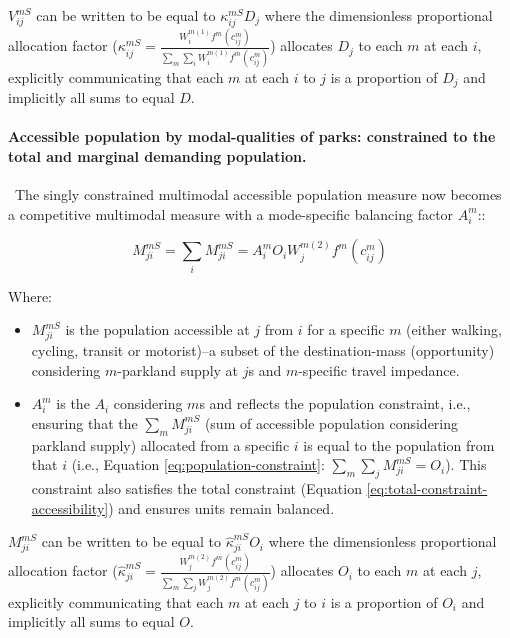 \documentclass[
11pt, %
oneside, %
english, %
singlespacing, %
]{macthesis} %
\def\tightlist{}
\begin{document}
\(V_{ij}^{mS}\) can be written to be equal to \(\kappa_{ij}^{mS} D_j\) where the dimensionless proportional allocation factor (\(\kappa_{ij}^{mS} = \frac{W_i^{m(1)} f^m(c^m_{ij})}{\sum_m\sum_i W_i^{m(1)} f^m(c^m_{ij})}\)) allocates \(D_j\) to each \(m\) at each \(i\), explicitly communicating that each \(m\) at each \(i\) to \(j\) is a proportion of \(D_j\) and implicitly all sums to equal \(D\).

\paragraph{Accessible population by modal-qualities of parks: constrained to the total and marginal demanding population.}\label{accessible-population-by-modal-qualities-of-parks-constrained-to-the-total-and-marginal-demanding-population.}

~The singly constrained multimodal accessible population measure now becomes a competitive multimodal measure with a mode-specific balancing factor \(A_i^{m}\)::

\begin{equation}
\label{eq:singly-constrained-multimodal-market-park}
M^{mS}_{ji} = \sum_i M^{mS}_{ji} = A_i^{m} O_i W_j^{m(2)} f^m(c^m_{ij})
\end{equation} 

Where:

\begin{itemize}
\tightlist
\item
  \(M^{mS}_{ji}\) is the population accessible at \(j\) from \(i\) for a specific \(m\) (either walking, cycling, transit or motorist)--a subset of the destination-mass (opportunity) considering \(m\)-parkland supply at \(j\)s and \(m\)-specific travel impedance.
\item
  \(A_i^{m}\) is the \(A_i\) considering \(m\)s and reflects the population constraint, i.e., ensuring that the \(\sum_m M^{mS}_{ji}\) (sum of accessible population considering parkland supply) allocated from a specific \(i\) is equal to the population from that \(i\) (i.e., Equation \ref{eq:population-constraint}: \(\sum_m \sum_j M^{mS}_{ji} = O_i\)). This constraint also satisfies the total constraint (Equation \ref{eq:total-constraint-accessibility}) and ensures units remain balanced.
\end{itemize}

\(M_{ji}^{mS}\) can be written to be equal to \(\hat \kappa_{ji}^{mS} O_i\) where the dimensionless proportional allocation factor (\(\hat \kappa_{ji}^{mS} =  \frac{W_j^{m(2)} f^m(c^m_{ij})}{\sum_m\sum_j W_j^{m(2)} f^m(c^m_{ij})}\)) allocates \(O_i\) to each \(m\) at each \(j\), explicitly communicating that each \(m\) at each \(j\) to \(i\) is a proportion of \(O_i\) and implicitly all sums to equal \(O\).
\end{document}
